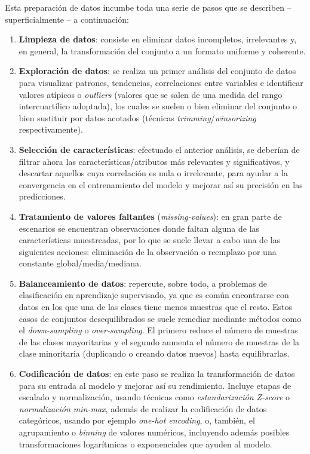 \documentclass[00-Trabajo_Final.tex]{subfiles}
\begin{document}
Esta preparación de datos incumbe toda una serie de pasos que se describen{ }--{ }superficialmente{ }--{ }a continuación:
\begin{enumerate}[itemsep=2pt]
    \item \textbf{Limpieza de datos}: consiste en eliminar datos incompletos, irrelevantes y, en general, la transformación del conjunto a un formato uniforme y coherente.
    \item \textbf{Exploración de datos}: se realiza un primer análisis del conjunto de datos para visualizar patrones, tendencias, correlaciones entre variables e identificar valores atípicos o \textit{outliers} (valores que se salen de una medida del rango intercuartílico adoptada), los cuales se suelen o bien eliminar del conjunto o bien sustituir por datos acotados (técnicas \textit{trimming}/\textit{winsorizing} respectivamente).
    \item \textbf{Selección de características}: efectuado el anterior análisis, se deberían de filtrar ahora las características/atributos más relevantes y significativos, y descartar aquellos cuya correlación es nula o irrelevante, para ayudar a la convergencia en el entrenamiento del modelo y mejorar así su precisión en las predicciones.
    \item \textbf{Tratamiento de valores faltantes} (\textit{missing-values}): en gran parte de escenarios se encuentran observaciones donde faltan alguna de las características muestreadas, por lo que se suele llevar a cabo una de las siguientes acciones: eliminación de la observación o reemplazo por una constante global/media/mediana.
    \item \textbf{Balanceamiento de datos}: repercute, sobre todo, a problemas de clasificación en aprendizaje supervisado, ya que es común encontrarse con datos en los que una de las clases tiene menos muestras que el resto. Estos casos de conjuntos desequilibrados se suele remediar mediante métodos como el \textit{down-sampling} o \textit{over-sampling}. El primero reduce el número de muestras de las clases mayoritarias y el segundo aumenta el número de muestras de la clase minoritaria (duplicando o creando datos nuevos) hasta equilibrarlas.
    \item \textbf{Codificación de datos}: en este paso se realiza la transformación de datos para su entrada al modelo y mejorar así su rendimiento. Incluye etapas de escalado y normalización, usando técnicas como \textit{estandarización Z-score} o \textit{normalización min-max}, además de realizar la codificación de datos categóricos, usando por ejemplo \textit{one-hot encoding}, o, también, el agrupamiento o \textit{binning} de valores numéricos, incluyendo además posibles transformaciones logarítmicas o exponenciales que ayuden al modelo.

\end{enumerate}
\end{document}
